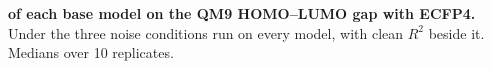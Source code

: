 
\begin{table}[H]
\centering
\caption{\textbf{\SuppFile{} \aucnorm{} of each base model on the QM9 HOMO--LUMO gap with ECFP4.}
Under the three noise conditions run on every model, with clean $R^2$ beside it. Medians over 10 replicates.}
\label{supp:robustness_qm9_ecfp4}
\small

\end{table}
